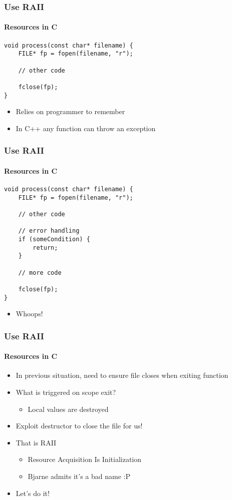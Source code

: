 \begin{frame}[fragile]
    \frametitle{\declarerule Use RAII}
    \framesubtitle{Resources in C}
    \begin{lstlisting}[title=Reading a file in C]
void process(const char* filename) {
    FILE* fp = fopen(filename, "r");

    // other code

    fclose(fp);
}
    \end{lstlisting}
    \begin{itemize}
        \item Relies on programmer to remember
        \item In C++ any function can throw an exception
    \end{itemize}
\end{frame}

\begin{frame}[fragile]
    \frametitle{\declarerule Use RAII}
    \framesubtitle{Resources in C}
    \begin{lstlisting}[title=Forgetting to close]
void process(const char* filename) {
    FILE* fp = fopen(filename, "r");

    // other code

    // error handling
    if (someCondition) {
        return;
    }

    // more code

    fclose(fp);
}
    \end{lstlisting}
    \begin{itemize}
        \item Whoops!
    \end{itemize}
\end{frame}

\begin{frame}
    \frametitle{\declarerule Use RAII}
    \framesubtitle{Resources in C}
    \begin{itemize}
        \item In previous situation, need to ensure file closes when exiting function
        \item What is triggered on scope exit?
            \begin{itemize}
                \item Local values are destroyed
            \end{itemize}
        \item Exploit destructor to close the file for us!
        \item That is RAII
            \begin{itemize}
                \item Resource Acquisition Is Initialization
                \item Bjarne admits it's a bad name :P
            \end{itemize}
        \item Let's do it!
    \end{itemize}
\end{frame}


